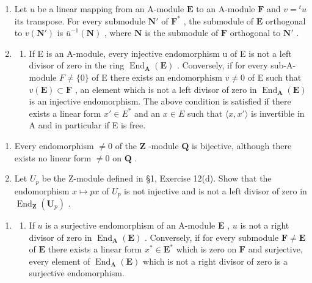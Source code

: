 \begin{enumerate}
\def\labelenumi{\arabic{enumi}.}
\setcounter{enumi}{4}
\item
  Let \(u\) be a linear mapping from an A-module \(\mathbf{E}\) to an A-module \(\mathbf{F}\) and \(v = {}^t u\) its transpose. For every submodule \(\mathbf{N}'\) of \(\mathbf{F}^*\) , the submodule of \(\mathbf{E}\) orthogonal to \(v(\mathbf{N}')\) is \(\overline{u}^{-1}(\mathbf{N})\) , where \(\mathbf{N}\) is the submodule of \(\mathbf{F}\) orthogonal to \(\mathbf{N}'\) .
\item
  \begin{enumerate}
  \def\labelenumii{(\alph{enumii})}
  \tightlist
  \item
    If E is an A-module, every injective endomorphism u of E is not a left divisor of zero in the ring \(\operatorname{End}_{\mathbf{A}}(\mathbf{E})\) . Conversely, if for every sub-A-module \(F \neq \{0\}\) of E there exists an endomorphism \(v \neq 0\) of E such that \(v(\mathbf{E}) \subset \mathbf{F}\) , an element which is not a left divisor of zero in \(\operatorname{End}_{\mathbf{A}}(\mathbf{E})\) is an injective endomorphism. The above condition is satisfied if there exists a linear form \(x' \in E^*\) and an \(x \in E\) such that \(\langle x, x' \rangle\) is invertible in A and in particular if E is free.
  \end{enumerate}
\end{enumerate}

\begin{enumerate}
\def\labelenumi{(\alph{enumi})}
\setcounter{enumi}{1}
\item
  Every endomorphism \(\neq 0\) of the \(\mathbf{Z}\) -module \(\mathbf{Q}\) is bijective, although there exists no linear form \(\neq 0\) on \(\mathbf{Q}\) .
\item
  Let \(U_{p}\) be the Z-module defined in §1, Exercise 12(d). Show that the endomorphism \(x \mapsto px\) of \(U_{p}\) is not injective and is not a left divisor of zero in \(\operatorname{End}_{\mathbf{Z}}(\mathbf{U}_{p})\) .
\end{enumerate}

\begin{enumerate}
\def\labelenumi{\arabic{enumi}.}
\setcounter{enumi}{6}
\tightlist
\item
  \begin{enumerate}
  \def\labelenumii{(\alph{enumii})}
  \tightlist
  \item
    If \(u\) is a surjective endomorphism of an A-module \(\mathbf{E}\) , \(u\) is not a right divisor of zero in \(\operatorname{End}_{\mathbf{A}}(\mathbf{E})\) . Conversely, if for every submodule \(\mathbf{F} \neq \mathbf{E}\) of \(\mathbf{E}\) there exists a linear form \(x^{*} \in \mathbf{E}^{*}\) which is zero on \(\mathbf{F}\) and surjective, every element of \(\operatorname{End}_{\mathbf{A}}(\mathbf{E})\) which is not a right divisor of zero is a surjective endomorphism.
  \end{enumerate}
\end{enumerate}

